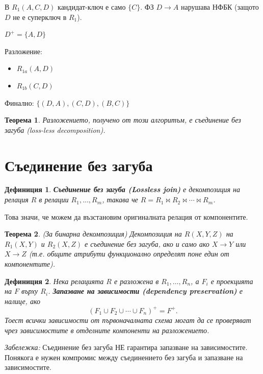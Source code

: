 \documentclass{scrartcl}
\newtheorem{definition}{Дефиниция}
\newtheorem{theorem}{Теорема}
\begin{document}
\begin{FlushLeft}
В $R_1(A, C, D)$ кандидат-ключ е само $\{C\}$. ФЗ $D \rightarrow A$ нарушава НФБК (защото $D$ не е суперключ в $R_1$).

$D^+ = \{A, D\}$

Разложение:
\begin{itemize}
    \item $R_{1a}(A, D)$
    \item $R_{1b}(C, D)$
\end{itemize}

Финално: $\{(D, A), (C, D), (B, C)\}$

\begin{theorem}
Разложението, получено от този алгоритъм, е съединение без загуба (loss-less decomposition).
\end{theorem}

\section{Съединение без загуба}

\begin{definition}
\textbf{\textit{Съединение без загуба (Lossless join)}} е декомпозиция на релация $R$ в релации $R_1, \ldots, R_m$, такава че $R = R_1 \bowtie R_2 \bowtie \cdots \bowtie R_m$.
\end{definition}

Това значи, че можем да възстановим оригиналната релация от компонентите.

\begin{theorem}
(За бинарна декомпозиция) Декомпозиция на $R(X, Y, Z)$ на $R_1(X, Y)$ и $R_2(X, Z)$ е съединение без загуба, ако и само ако $X \rightarrow Y$ или $X \rightarrow Z$ (т.е. общите атрибути функционално определят поне един от компонентите).
\end{theorem}

\begin{definition}
Нека релацията $R$ е разложена в $R_1, \ldots, R_n$, а $F_i$ е проекцията на $F$ върху $R_i$. \textbf{\textit{Запазване на зависимости (dependency preservation)}} е налице, ако
$$
(F_1 \cup F_2 \cup \cdots \cup F_n)^+ = F^+.
$$
Тоест всички зависимости от първоначалната схема могат да се проверяват чрез зависимостите в отделните компоненти на разложението.
\end{definition}

\textit{Забележка:} Съединение без загуба НЕ гарантира запазване на зависимостите. Понякога е нужен компромис между съединението без загуба и запазване на зависимостите.


\end{FlushLeft}
\end{document}
